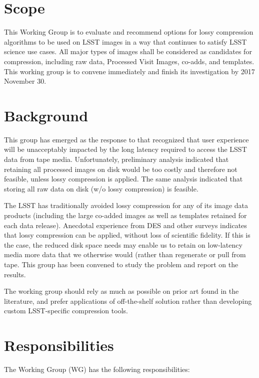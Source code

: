
\section{Scope}

This Working Group is to evaluate and recommend options for lossy compression
algorithms to be used on LSST images in a way that continues to satisfy LSST
science use cases. All major types of images shall be considered as candidates
for compression, including raw data, Processed Visit Images, co-adds, and
templates.  This working group is to convene immediately and finish its
investigation by 2017 November 30.

\section{Background}

This group has emerged as the response to  that recognized that user
experience will be unacceptably impacted by the long latency required to
access the LSST data from tape media. Unfortunately, preliminary analysis
indicated that retaining all processed images on disk would be too costly
and therefore not feasible, unless lossy compression is applied. The same
analysis indicated that storing all raw data on disk (w/o lossy compression)
is feasible.

The LSST has traditionally avoided lossy compression for any of its image
data products (including the large co-added images as well as templates
retained for each data release). Anecdotal experience from DES and other
surveys indicates that lossy compression can be applied, without loss of
scientific fidelity. If this is the case, the reduced disk space needs may
enable us to retain on low-latency media more data that we otherwise would
(rather than regenerate or pull from tape. This group has been convened to
study the problem and report on the results.

The working group should rely as much as possible on prior art found in the
literature, and prefer applications of off-the-shelf solution rather than
developing custom LSST-specific compression tools.

\section{Responsibilities}

The Working Group (WG) has the following responsibilities:

